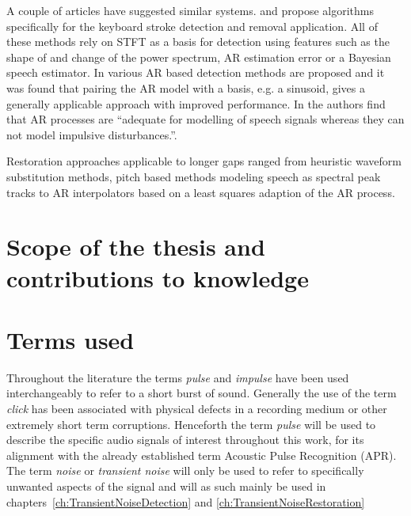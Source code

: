 A couple of articles have suggested similar systems\cite{Subramanya2007}\cite{Sugiyama2007}\cite{Abramson2007}. \cite{Subramanya2007} and \cite{Sugiyama2007} propose algorithms specifically for the keyboard stroke detection and removal application. All of these methods rely on STFT as a basis for detection using features such as the shape of and change of the power spectrum\cite{Sugiyama2007}, AR estimation error\cite{Subramanya2007}\cite{Kauppinen2002} or a Bayesian speech estimator\cite{Abramson2007}. In \cite{Godsill1998book} various AR based detection methods are proposed and it was found that pairing the AR model with a basis, e.g. a sinusoid, gives a generally applicable approach with improved performance. In \cite{Vaseghi1990} the authors find that AR processes are ``adequate for modelling of speech signals whereas they can not model impulsive disturbances.''.

Restoration approaches applicable to longer gaps ranged from heuristic waveform substitution methods\cite{Goodman1986}\cite{Niediwiecki2001}, pitch based methods modeling speech as spectral peak tracks\cite{Maher1994}\cite{McAulay1986} to AR interpolators\cite{Esquef2006} based on a least squares adaption of the AR process\cite{Godsill1998book}.

\section{Scope of the thesis and contributions to knowledge}

\section{Terms used}
Throughout the literature the terms \emph{pulse}\cite{Esquef2002a}\cite{Esquef2003a} and \emph{impulse}\cite{Czyzewski1995}\cite{Kauppinen2002a}\cite{Chen2000} have been used interchangeably to refer to a short burst of sound. Generally the use of the term \emph{click}\cite{Czyzewski1995}\cite{Esquef2002}\cite{Godsill1998book} has been associated with physical defects in a recording medium or other extremely short term corruptions. Henceforth the term \emph{pulse} will be used to describe the specific audio signals of interest throughout this work, for its alignment with the already established term Acoustic Pulse Recognition (APR)\cite{TouchSystems2006}. The term \emph{noise} or \emph{transient noise} will only be used to refer to specifically unwanted aspects of the signal and will as such mainly be used in chapters~\ref{ch:TransientNoiseDetection} and \ref{ch:TransientNoiseRestoration}

